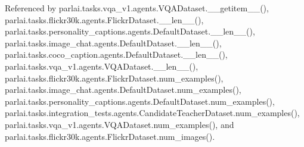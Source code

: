 Referenced by parlai.\+tasks.\+vqa\+\_\+v1.\+agents.\+V\+Q\+A\+Dataset.\+\_\+\+\_\+getitem\+\_\+\+\_\+(), parlai.\+tasks.\+flickr30k.\+agents.\+Flickr\+Dataset.\+\_\+\+\_\+len\+\_\+\+\_\+(), parlai.\+tasks.\+personality\+\_\+captions.\+agents.\+Default\+Dataset.\+\_\+\+\_\+len\+\_\+\+\_\+(), parlai.\+tasks.\+image\+\_\+chat.\+agents.\+Default\+Dataset.\+\_\+\+\_\+len\+\_\+\+\_\+(), parlai.\+tasks.\+coco\+\_\+caption.\+agents.\+Default\+Dataset.\+\_\+\+\_\+len\+\_\+\+\_\+(), parlai.\+tasks.\+vqa\+\_\+v1.\+agents.\+V\+Q\+A\+Dataset.\+\_\+\+\_\+len\+\_\+\+\_\+(), parlai.\+tasks.\+flickr30k.\+agents.\+Flickr\+Dataset.\+num\+\_\+examples(), parlai.\+tasks.\+image\+\_\+chat.\+agents.\+Default\+Dataset.\+num\+\_\+examples(), parlai.\+tasks.\+personality\+\_\+captions.\+agents.\+Default\+Dataset.\+num\+\_\+examples(), parlai.\+tasks.\+integration\+\_\+tests.\+agents.\+Candidate\+Teacher\+Dataset.\+num\+\_\+examples(), parlai.\+tasks.\+vqa\+\_\+v1.\+agents.\+V\+Q\+A\+Dataset.\+num\+\_\+examples(), and parlai.\+tasks.\+flickr30k.\+agents.\+Flickr\+Dataset.\+num\+\_\+images().

